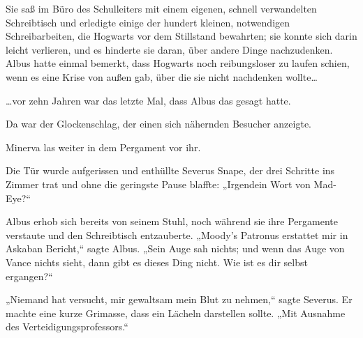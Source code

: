 Sie saß im Büro des Schulleiters mit einem eigenen, schnell verwandelten Schreibtisch und erledigte einige der hundert kleinen, notwendigen Schreibarbeiten, die Hogwarts vor dem Stillstand bewahrten; sie konnte sich darin leicht verlieren, und es hinderte sie daran, über andere Dinge nachzudenken. Albus hatte einmal bemerkt, dass Hogwarts noch reibungsloser zu laufen schien, wenn es eine Krise von außen gab, über die sie nicht nachdenken wollte…

…vor zehn Jahren war das letzte Mal, dass Albus das gesagt hatte.

Da war der Glockenschlag, der einen sich nähernden Besucher anzeigte.

Minerva las weiter in dem Pergament vor ihr.

Die Tür wurde aufgerissen und enthüllte Severus Snape, der drei Schritte ins Zimmer trat und ohne die geringste Pause blaffte: „Irgendein Wort von Mad-Eye?“

Albus erhob sich bereits von seinem Stuhl, noch während sie ihre Pergamente verstaute und den Schreibtisch entzauberte. „Moody’s Patronus erstattet mir in Askaban Bericht,“ sagte Albus. „Sein Auge sah nichts; und wenn das Auge von Vance nichts sieht, dann gibt es dieses Ding nicht. Wie ist es dir selbst ergangen?“

„Niemand hat versucht, mir gewaltsam mein Blut zu nehmen,“ sagte Severus. Er machte eine kurze Grimasse, dass ein Lächeln darstellen sollte. „Mit Ausnahme des Verteidigungsprofessors.“

